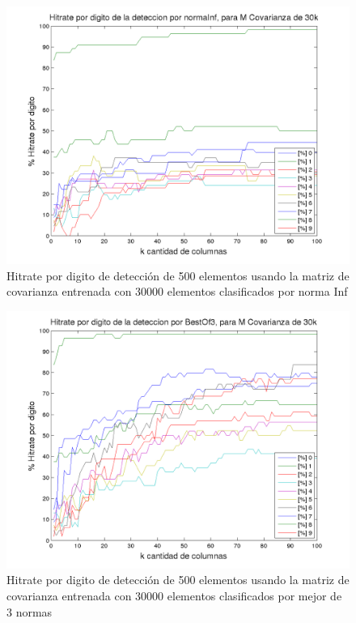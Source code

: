 \begin{figure}[H]
\begin {center}
\includegraphics[width=\pdwidth]{plots/pordig-30kcv-normaInf.png}
\end {center}
\caption{Hitrate por digito de detecci\'on de 500 elementos usando la matriz de covarianza entrenada con 30000 elementos
clasificados por norma Inf}
\label{fig:HRD30kcv-ninf}
\end{figure}

\begin{figure}[H]
\begin {center}
\includegraphics[width=\pdwidth]{plots/pordig-30kcv-BestOf3.png}
\end {center}
\caption{Hitrate por digito de detecci\'on de 500 elementos usando la matriz de covarianza entrenada con 30000 elementos
clasificados por mejor de 3 normas}
\label{fig:HRD30kcv-bo3}
\end{figure}

